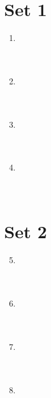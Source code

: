 \documentclass[11pt]{article}
\begin{document}
\newcommand{\sevenpoints}{}
\newcommand{\righthead}{\fdbox{Round}{Guts}\fdbox{Team Number}{\phantom{00}}}

\section*{Set 1}

\begin{multicols*}{1}
 \begin{enumerate} 
\setcounter{enumi}{0}

\item \underline{\phantom{000000000000000}} \\ \\ \\
\item \underline{\phantom{000000000000000}} \\ \\ \\
\item \underline{\phantom{000000000000000}} \\ \\ \\
\item \underline{\phantom{000000000000000}} \\ \\ \\

\end{enumerate} \end{multicols*}

\eject

\section*{Set 2}

\begin{multicols*}{1} \begin{enumerate} 
\setcounter{enumi}{4}

\item \underline{\phantom{000000000000000}} \\ \\ \\
\item \underline{\phantom{000000000000000}} \\ \\ \\
\item \underline{\phantom{000000000000000}} \\ \\ \\
\item \underline{\phantom{000000000000000}} \\ \\ \\

\end{enumerate} \end{multicols*}
\end{document}
